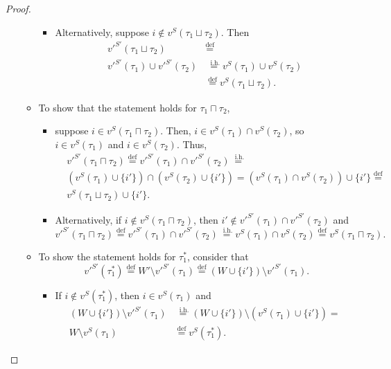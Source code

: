 \documentclass{article}
\newcommand{\lcup}{\sqcup}
\newcommand{\lcap}{\sqcap}
\newcommand{\lstar}{^*}
\newcommand{\eqdef}{\stackrel{\text{def}}{=}}
\newcommand{\eqih}{\stackrel{\text{ i.h.}}{=}}
\begin{document}
\begin{proof}
\begin{itemize}
\begin{itemize}
\begin{itemize}
      \item Alternatively, suppose $i \not \in v^S(\tau_1 \lcup \tau_2)$. Then
        \begin{align*}
          v'^{S'}(\tau_1 \lcup \tau_2) &\eqdef \\
          v'^{S'}(\tau_1) \cup v'^{S'}(\tau_2) &\eqih v^S(\tau_1) \cup v^S(\tau_2) \\
          &\eqdef v^S(\tau_1 \lcup \tau_2).
        \end{align*}
      \end{itemize}

    \item To show that the statement holds for $\tau_1 \lcap \tau_2$,
      \begin{itemize}
      \item suppose $i \in v^S(\tau_1 \lcap \tau_2)$. Then, $i \in v^S(\tau_1) \cap v^S(\tau_2)$, so $i \in v^S(\tau_1)$ and $i \in v^S(\tau_2)$. Thus,
        \begin{align*}
          &v'^{S'}(\tau_1 \lcap \tau_2) \eqdef v'^{S'}(\tau_1) \cap v'^{S'}(\tau_2) \eqih \\
          &(v^S(\tau_1) \cup \{i'\}) \cap (v^S(\tau_2) \cup \{i'\}) = (v^S(\tau_1) \cap v^S(\tau_2)) \cup \{i'\} \eqdef \\
          &v^S(\tau_1 \lcup \tau_2) \cup \{i'\}.
        \end{align*}

      \item Alternatively, if $i \not \in v^S(\tau_1 \lcap \tau_2)$, then $i' \not \in v'^{S'}(\tau_1) \cap v'^{S'}(\tau_2)$ and
        \begin{equation*}
          v'^{S'}(\tau_1 \lcap \tau_2) \eqdef v'^{S'}(\tau_1) \cap v'^{S'}(\tau_2) \eqih v^S(\tau_1) \cap v^S(\tau_2) \eqdef v^S(\tau_1 \lcap \tau_2).
        \end{equation*}
      \end{itemize}


    \item To show the statement holds for $\tau_1\lstar$, consider that
      \begin{equation*}
        v'^{S'}(\tau_1\lstar) \eqdef W' \setminus v'^{S'}(\tau_1) \eqdef (W \cup \{i'\}) \setminus v'^{S'}(\tau_1).
      \end{equation*}
      \begin{itemize}
      \item If $i \not \in v^S(\tau_1\lstar)$, then $i \in v^S(\tau_1)$ and
        \begin{align*}
          (W \cup \{i'\}) \setminus v'^{S'}(\tau_1) &\eqih (W \cup \{i'\}) \setminus (v^S(\tau_1) \cup \{i'\}) = \\
          W \setminus v^S(\tau_1) &\eqdef v^S(\tau_1\lstar).
        \end{align*}


\end{itemize}
\end{itemize}
\end{itemize}
\end{proof}
\end{document}
